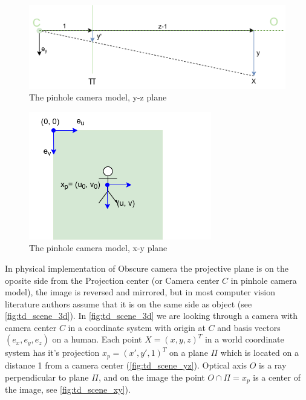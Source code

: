 \begin{figure}[h]
    \centering
    \includegraphics[width=1\textwidth]{graphics/td_scene_yz.png}
    \caption{The pinhole camera model, y-z plane}
    \label{fig:td_scene_yz}
\end{figure}

\begin{figure}[h]
    \centering
    \includegraphics[width=.5\textwidth]{graphics/td_scene_xy.png}
    \caption{The pinhole camera model, x-y plane}
    \label{fig:td_scene_xy}
\end{figure}

In physical implementation of Obscure camera the projective plane is on the oposite side from the Projection center (or Camera center $C$ in pinhole camera model), the image is reversed and mirrored, but in most computer vision literature authors assume that it is on the same side as object (see \autoref{fig:td_scene_3d}).
In \autoref{fig:td_scene_3d} we are looking through a camera with camera center $C$ in a coordinate system with origin at $C$ and basis vectors $(e_x, e_y, e_z)$ on a human. 
Each point $X = (x, y, z)^T$ in a world coordinate system has it's projection $x_p = (x', y', 1)^T$ on a plane $\Pi$ which is located on a distance 1 from a camera center (\autoref{fig:td_scene_yz}). 
Optical axis $O$ is a ray perpendicular to plane $\Pi$, and on the image the point $ O \cap \Pi = x_p$ is a center of the image, see \autoref{fig:td_scene_xy}).

